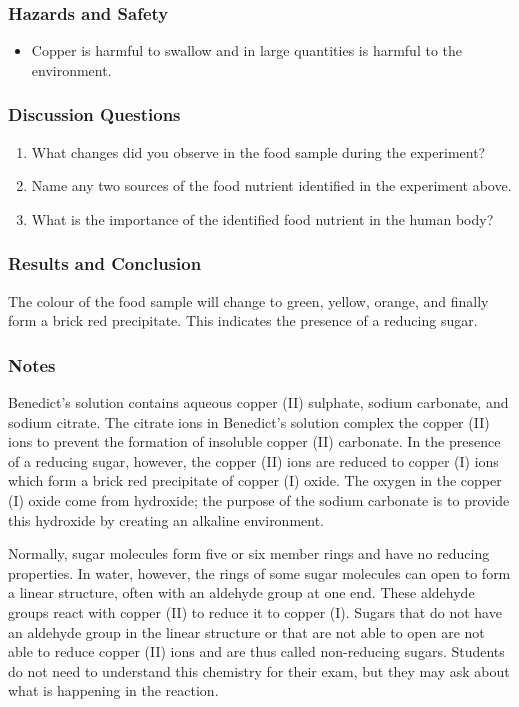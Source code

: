 \subsubsection*{Hazards and Safety}
\begin{itemize}
\item{Copper is harmful to swallow and in large quantities is harmful to the environment.}
\end{itemize}

\subsubsection*{Discussion Questions}
\begin{enumerate}
\item{What changes did you observe in the food sample during the experiment?}
\item{Name any two sources of the food nutrient identified in the experiment above.}
\item{What is the importance of the identified food nutrient in the human body?}
\end{enumerate}

\subsubsection*{Results and Conclusion}
The colour of the food sample will change to green, yellow, orange, and finally form a brick red precipitate. This indicates the presence of a reducing sugar.

\subsubsection*{Notes}
Benedict's solution contains aqueous copper (II) sulphate, sodium carbonate, and sodium citrate. The citrate ions in Benedict's solution complex the copper (II) ions to prevent the formation of insoluble copper (II) carbonate. In the presence of a reducing sugar, however, the copper (II) ions are reduced to copper (I) ions which form a brick red precipitate of copper (I) oxide. The oxygen in the copper (I) oxide come from hydroxide; the purpose of the sodium carbonate is to provide this hydroxide by creating an alkaline environment.

Normally, sugar molecules form five or six member rings and have no reducing properties. In water, however, the rings of some sugar molecules can open to form a linear structure, often with an aldehyde group at one end. These aldehyde groups react with copper (II) to reduce it to copper (I). Sugars that do not have an aldehyde group in the linear structure or that are not able to open are not able to reduce copper (II) ions and are thus called non-reducing sugars. Students do not need to understand this chemistry for their exam, but they may ask about what is happening in the reaction.

